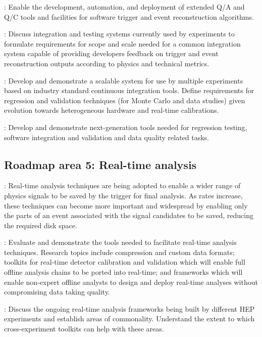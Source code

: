 \vskip 0.5cm
: Enable the development, automation, and deployment of extended Q/A and Q/C tools and facilities for software trigger and event reconstruction algorithms. 

\vskip 0.5cm
: Discuss integration and testing systems currently used by experiments to    formulate requirements for scope and scale needed for a common integration system capable of providing developers feedback on trigger and event reconstruction outputs according to physics and technical metrics.

\vskip 0.5cm
: Develop and demonstrate a scalable system for use by multiple experiments based on industry standard continuous integration tools. Define requirements for regression and validation techniques (for Monte Carlo and data studies) given evolution towards heterogeneous hardware and real-time calibrations.

\vskip 0.5cm
: Develop and demonstrate next-generation tools needed for regression testing, software integration and validation and data quality related tasks. 

\subsection{Roadmap area 5: Real-time analysis}

: Real-time analysis techniques are being adopted to enable a wider range of physics signals to be saved by the trigger for final analysis. As rates increase, these techniques can become more important and widespread by enabling only the parts of an event associated with the signal candidates to be saved, reducing the required disk space.

\vskip 0.5cm
 : Evaluate and demonstrate the tools needed to facilitate real-time analysis techniques. Research topics include compression and custom data formats; toolkits for real-time detector calibration and validation which will enable full offline analysis chains to be ported into real-time; and frameworks which will enable non-expert offline analysts to design and deploy real-time analyses without compromising data taking quality. 

\vskip 0.5cm
: Discuss the ongoing real-time analysis frameworks being built by different HEP experiments and establish areas of commonality. Understand the extent to which cross-experiment toolkits can help with these areas. 

